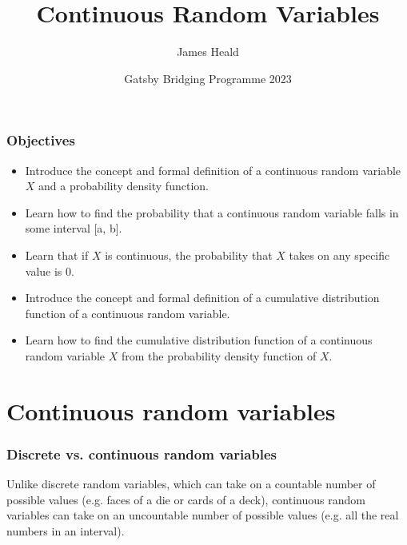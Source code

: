 \documentclass[9pt]{beamer}
\title[Continuous Random Variables ]
{Continuous Random Variables\newline }
\subtitle{}
\author[James Heald] %
{James Heald\inst{1}}
\institute[UCL] %
{
  \inst{1}%
  Gatsby Computational Neuroscience Unit\\
  University College London
}
\date[Gatsby Bridging Programme  2023] %
{Gatsby Bridging Programme 2023}
\begin{document}
\frame{\titlepage}



\begin{frame}
\frametitle{Objectives}
\begin{itemize}
    \item Introduce the concept and formal definition of a continuous random variable $X$ and a probability density function.
        \item Learn how to find the probability that a continuous random variable falls in some interval [a, b].
    \item Learn that if $X$ is continuous, the probability that $X$ takes on any specific value is 0.
    \item Introduce the concept and formal definition of a cumulative distribution function of a continuous random variable.
    \item Learn how to find the cumulative distribution function of a continuous random variable $X$ from the probability density function of $X$.
\end{itemize}
\end{frame}

\section{Continuous random variables}
\begin{frame}
\frametitle{Discrete vs. continuous random variables}

Unlike discrete random variables, which can take on a countable number of possible values (e.g. faces of a die or cards of a deck), continuous random variables can take on an uncountable number of possible values (e.g. all the real numbers in an interval).

\


\end{frame}
\end{document}
